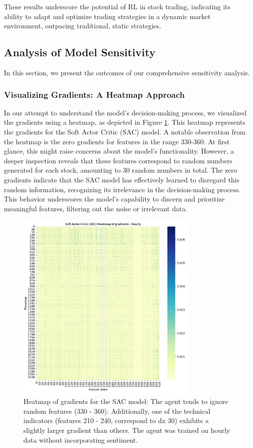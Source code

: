 \documentclass[12pt]{article}
\begin{document}
These results underscore the potential of RL in stock trading, indicating its ability to adapt and optimize trading strategies in a dynamic market environment, outpacing traditional, static strategies.


\subsection{Analysis of Model Sensitivity}
In this section, we present the outcomes of our comprehensive sensitivity analysis.

\subsubsection{Visualizing Gradients: A Heatmap Approach}
In our attempt to understand the model's decision-making process, we visualized the gradients using a heatmap, as depicted in Figure \ref{fig:Heatmap_hourly_SAC_random}. This heatmap represents the gradients for the Soft Actor Critic (SAC) model. A notable observation from the heatmap is the zero gradients for features in the range 330-360. At first glance, this might raise concerns about the model's functionality. However, a deeper inspection reveals that these features correspond to random numbers generated for each stock, amounting to 30 random numbers in total. The zero gradients indicate that the SAC model has effectively learned to disregard this random information, recognizing its irrelevance in the decision-making process. This behavior underscores the model's capability to discern and prioritize meaningful features, filtering out the noise or irrelevant data.

\begin{figure}[h]
    \centering
    \includegraphics[width=0.8\textwidth]{figs/Heatmap_hourly_SAC_random.jpg}
    \caption{Heatmap of gradients for the SAC model: The agent tends to ignore random features (330 - 360). Additionally, one of the technical indicators (features 210 - 240, correspond to dx 30) exhibits a slightly larger gradient than others. The agent was trained on hourly data without incorporating sentiment.}

    \label{fig:Heatmap_hourly_SAC_random}
\end{figure}
\end{document}

